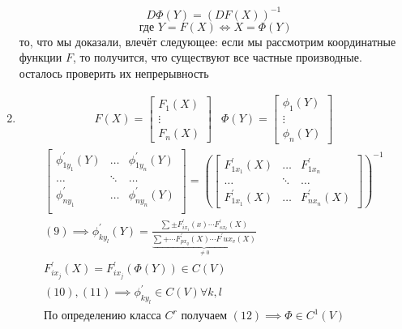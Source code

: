 \documentclass[main]{subfiles}
\begin{document}
\begin{longProof}
\begin{enumerate}
                  \[ D\Phi(Y) = (DF(X))^{-1} \tag{9} \] 
                  \[ \text{ где } Y = F(X) \Leftrightarrow X = \Phi(Y) \] 
                  то, что мы доказали, влечёт следующее: если мы рассмотрим координатные функции $F$,
                  то получится, что существуют все частные производные. осталось проверить их непрерывность
                  \item 
                  \begin{align*}
                     F(X) =
                  \begin{bmatrix*}
                     F_1(X) \\
                     \vdots \\
                     F_n(X) 
                  \end{bmatrix*} &
                  \Phi(Y) = \begin{bmatrix*}
                     \phi_1(Y) \\
                     \vdots \\
                     \phi_n(Y)                     
                  \end{bmatrix*} 
               \end{align*}
               \begin{gather*}
               \begin{bmatrix*}
                  \phi^\prime_{1y_1}(Y) & \ldots & \phi^\prime_{1y_n}(Y) \\
                  \ldots & \ddots & \ldots \\
                   \phi^\prime_{ny_1} & \ldots & \phi^\prime_{ny_n}(Y) \\
               \end{bmatrix*} =
               \left( \begin{bmatrix*}
                  F^\prime_{1x_1}(X) & \ldots & F^\prime_{1x_n} \\
                  \ldots & \ddots & \ldots \\
                  F^\prime_{1x_1}(X) & \ldots & F^\prime_{nx_n}(X)
               \end{bmatrix*} \right)^{-1} \\
               (9) \implies \phi^\prime_{ky_l}(Y) = \frac{\sum \pm F^\prime_{ix_i}(x)
               \cdots F^\prime_{sx_t}(X)}{\underbrace{\sum + \cdots F^\prime_{px_q}(X) \cdots F^\prime{ux_v}(X)}_{\ne 0}}
               \tag{10}\\
                F^\prime_{ix_j}(X) = F^\prime_{ix_j}(\Phi(Y)) \in C(V) \tag{11} \\
               (10), (11) \implies \phi^\prime_{ky_l} \in C(V) \forall k, l \tag{12} \\
               \text{По определению класса } C^r \text{ получаем } 
               (12) \implies \Phi \in C^1(V) \end{gather*}
               \end{enumerate}
        \end{longProof}
\end{document}
